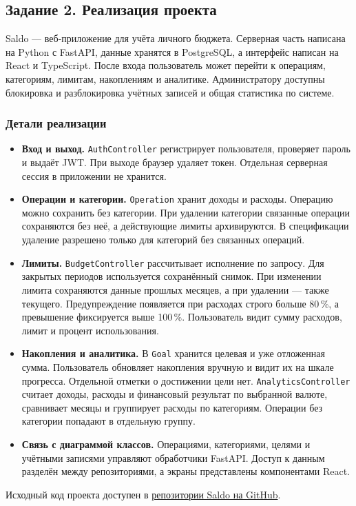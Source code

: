 \documentclass[14pt,a4paper]{extarticle}
\begin{document}
\subsection*{Задание 2. Реализация проекта}

Saldo --- веб-приложение для учёта личного бюджета. Серверная часть написана на Python с FastAPI, данные хранятся в PostgreSQL, а интерфейс написан на React и TypeScript. После входа пользователь может перейти к операциям, категориям, лимитам, накоплениям и аналитике. Администратору доступны блокировка и разблокировка учётных записей и общая статистика по системе.

\subsubsection*{Детали реализации}

\begin{itemize}
    \item \textbf{Вход и выход.} \texttt{AuthController} регистрирует пользователя, проверяет пароль и выдаёт JWT. При выходе браузер удаляет токен. Отдельная серверная сессия в приложении не хранится.

    \item \textbf{Операции и категории.} \texttt{Operation} хранит доходы и расходы. Операцию можно сохранить без категории. При удалении категории связанные операции сохраняются без неё, а действующие лимиты архивируются. В спецификации удаление разрешено только для категорий без связанных операций.

    \item \textbf{Лимиты.} \texttt{BudgetController} рассчитывает исполнение по запросу. Для закрытых периодов используется сохранённый снимок. При изменении лимита сохраняются данные прошлых месяцев, а при удалении --- также текущего. Предупреждение появляется при расходах строго больше 80\,\%, а превышение фиксируется выше 100\,\%. Пользователь видит сумму расходов, лимит и процент использования.

    \item \textbf{Накопления и аналитика.} В \texttt{Goal} хранится целевая и уже отложенная сумма. Пользователь обновляет накопления вручную и видит их на шкале прогресса. Отдельной отметки о достижении цели нет. \texttt{AnalyticsController} считает доходы, расходы и финансовый результат по выбранной валюте, сравнивает месяцы и группирует расходы по категориям. Операции без категории попадают в отдельную группу.

    \item \textbf{Связь с диаграммой классов.} Операциями, категориями, целями и учётными записями управляют обработчики FastAPI. Доступ к данным разделён между репозиториями, а экраны представлены компонентами React.
\end{itemize}

Исходный код проекта доступен в \href{https://github.com/Qudef1/budget_tracker}{репозитории Saldo на GitHub}.
\end{document}
